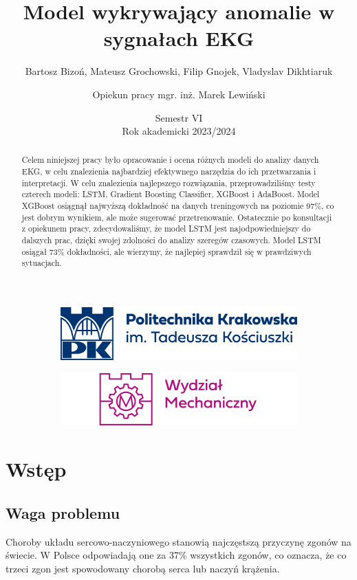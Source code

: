 \documentclass[12pt,a4paper]{article}
\title{\huge{Model wykrywający anomalie w sygnałach EKG } }
\author{Bartosz Bizoń, Mateusz Grochowski, Filip Gnojek, Vladyslav Dikhtiaruk
\and \small{Opiekun pracy mgr. inż. Marek Lewiński}}
\date{Semestr VI \\ Rok akademicki 2023/2024}
\begin{document}
\begin{figure}
    \begin{subfigure}{.49\textwidth}
      \includegraphics[width=.7\linewidth]{images/PK_POZIOM_RGB.png}
      \centering
    \end{subfigure}
    \begin{subfigure}{.49\textwidth}
      \includegraphics[width=.7\linewidth]{WM_RGB.png}
      \centering
    \end{subfigure}
\end{figure}
\maketitle


\begin{abstract} 
Celem niniejszej pracy było opracowanie i ocena różnych modeli do analizy danych EKG, w celu znalezienia najbardziej efektywnego narzędzia do ich przetwarzania i interpretacji. W celu znalezienia najlepszego rozwiązania, przeprowadziliśmy testy czterech modeli: LSTM, Gradient Boosting Classifier, XGBoost i AdaBoost. Model XGBoost osiągnął najwyższą dokładność na danych treningowych na poziomie 97\%, co jest dobrym wynikiem, ale może sugerować przetrenowanie. Ostatecznie po konsultacji z opiekunem pracy, zdecydowaliśmy, że model LSTM jest najodpowiedniejszy do dalszych prac, dzięki swojej zdolności do analizy szeregów czasowych. Model LSTM osiągał 73\% dokładności, ale wierzymy, że najlepiej sprawdził się w prawdziwych sytuacjach.

\end{abstract}

\newpage

\tableofcontents

\newpage
\section{Wstęp}

\subsection{Waga problemu}
Choroby układu sercowo-naczyniowego stanowią najczęstszą przyczynę zgonów na świecie. W Polsce odpowiadają one za 37\% wszystkich zgonów, co oznacza, że co trzeci zgon jest spowodowany chorobą serca lub naczyń krążenia.
\end{document}
